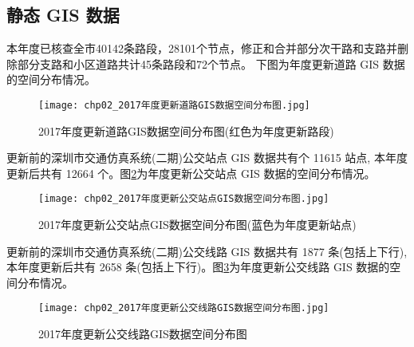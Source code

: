\subsection{静态 GIS 数据}
本年度已核查全市40142条路段，28101个节点，修正和合并部分次干路和支路并删除部分支路和小区道路共计45条路段和72个节点。
下图为年度更新道路 GIS 数据的空间分布情况。

\begin{figure}[ht]
  \centering
  \texttt{[image: chp02\_2017年度更新道路GIS数据空间分布图.jpg]}
  \caption[2017年度更新道路GIS数据空间分布图]{2017年度更新道路GIS数据空间分布图(红色为年度更新路段)\label{fig:2017年度更新道路GIS数据空间分布图}}
\end{figure}

更新前的深圳市交通仿真系统(二期)公交站点 GIS 数据共有个 11615 站点,
本年度更新后共有 12664 个。图\ref{fig:2017年度更新公交站点GIS数据空间分布图}为年度更新公交站点 GIS 数据的空间分布情况。

\begin{figure}[ht]
  \centering
  \texttt{[image: chp02\_2017年度更新公交站点GIS数据空间分布图.jpg]}
  \caption[2017年度更新公交站点GIS数据空间分布图]{2017年度更新公交站点GIS数据空间分布图(蓝色为年度更新站点)\label{fig:2017年度更新公交站点GIS数据空间分布图}}
\end{figure}

更新前的深圳市交通仿真系统(二期)公交线路 GIS 数据共有 1877 条(包括上下行),本年度更新后共有 2658 条(包括上下行)。图\ref{fig:2017年度更新公交线路GIS数据空间分布图}为年度更新公交线路 GIS 数据的空间分布情况。

\begin{figure}[ht]
  \centering
  \texttt{[image: chp02\_2017年度更新公交线路GIS数据空间分布图.jpg]}
  \caption{2017年度更新公交线路GIS数据空间分布图\label{fig:2017年度更新公交线路GIS数据空间分布图}}
\end{figure}

